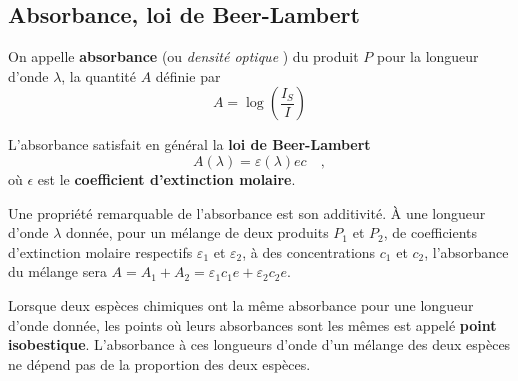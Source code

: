 \documentclass{tp}
\begin{document}
\begin{center}
\end{center}

\subsection{Absorbance, loi de Beer-Lambert}%
\label{sub:absorbance_loi_de_beer_lambert}
On appelle \textbf{absorbance} (ou \emph{densité optique} ) du produit $P$ pour la longueur d'onde $\lambda$, la quantité $A$ définie par
\begin{equation}
  A = \log \left( \frac{I_S}{I} \right) 
\end{equation}

L'absorbance satisfait en général la \textbf{loi de Beer-Lambert} 
\begin{equation}
  A(\lambda) = \varepsilon(\lambda)ec \quad ,
\end{equation}
où $\epsilon$ est le \textbf{coefficient d'extinction molaire}.

Une propriété remarquable de l'absorbance est son additivité. À une longueur d'onde $\lambda$ donnée, pour un mélange de deux produits $P_1$ et $P_2$, de coefficients d'extinction molaire respectifs $\varepsilon_1$ et $\varepsilon_2$, à des concentrations $c_1$ et $c_2$, l'absorbance du mélange sera $A=A_1+A_2=\varepsilon_1c_1e + \varepsilon_2c_2e$. 

Lorsque deux espèces chimiques ont la même absorbance pour une longueur d'onde donnée, les points où leurs absorbances sont les mêmes est appelé \textbf{point isobestique}. L'absorbance à ces longueurs d'onde d'un mélange des deux espèces ne dépend pas de la proportion des deux espèces.
\end{document}

